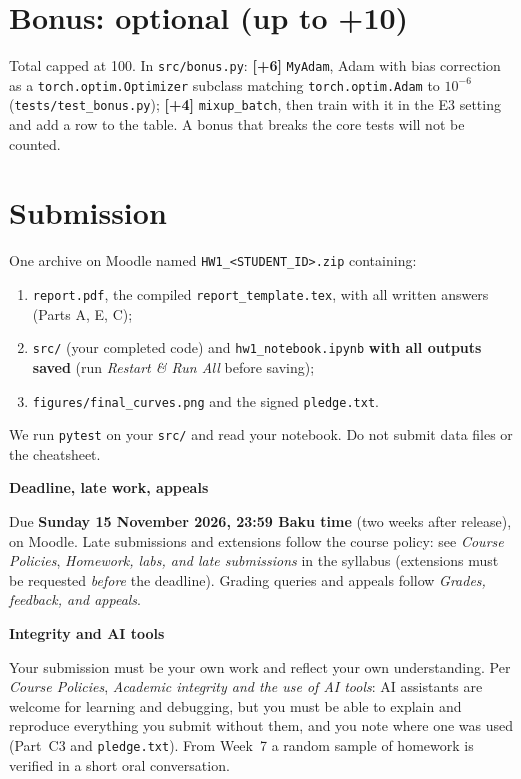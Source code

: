 \documentclass[11pt,a4paper]{article}
\begin{document}
\section{Bonus: optional (up to +10)}
Total capped at 100. In \texttt{src/bonus.py}: \textbf{[+6]} \texttt{MyAdam}, Adam with bias correction as a \texttt{torch.optim.Optimizer} subclass matching \texttt{torch.optim.Adam} to $10^{-6}$ (\texttt{tests/test\_bonus.py});
\textbf{[+4]} \texttt{mixup\_batch}, then train with it in the E3 setting and add a row to the table. A bonus that breaks the core tests will not be counted.

\section{Submission}\label{sec:submit}
One archive on Moodle named \texttt{HW1\_<STUDENT\_ID>.zip} containing:
\begin{enumerate}
  \item \texttt{report.pdf}, the compiled \texttt{report\_template.tex}, with all written answers (Parts A, E, C);
  \item \texttt{src/} (your completed code) and \texttt{hw1\_notebook.ipynb} \textbf{with all outputs saved} (run \emph{Restart \& Run All} before saving);
  \item \texttt{figures/final\_curves.png} and the signed \texttt{pledge.txt}.
\end{enumerate}
We run \texttt{pytest} on your \texttt{src/} and read your notebook. Do not submit data files or the cheatsheet.

\begin{policybox}
{\headingfont\bfseries\color{Indigo}Deadline, late work, appeals\par}\smallskip
Due \textbf{Sunday 15 November 2026, 23:59 Baku time} (two weeks after release), on Moodle. Late submissions and extensions follow the course policy: see \emph{Course Policies}, \emph{Homework, labs, and late submissions}
in the syllabus (extensions must be requested \emph{before} the deadline). Grading queries and appeals follow \emph{Grades, feedback, and appeals}.
\end{policybox}

\begin{notebox}
{\headingfont\bfseries\color{Indigo}Integrity and AI tools\par}\smallskip
Your submission must be your own work and reflect your own understanding. Per \emph{Course Policies}, \emph{Academic integrity and the use of AI tools}: AI assistants are welcome for learning and debugging,
but you must be able to explain and reproduce everything you submit without them, and you note where one was used (Part~C3 and \texttt{pledge.txt}). From Week~7 a random sample of homework is verified in a short oral conversation.
\end{notebox}
\end{document}
